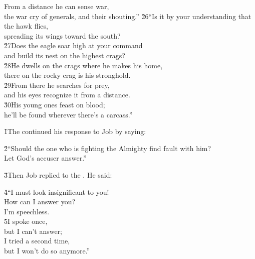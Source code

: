 \begin{poetry}
\poemll    From a distance he can sense war, \\
\poemlll       the war cry of generals, and their shouting.''
\poeml \v{26}``Is it by your understanding that the hawk flies, \\
\poemll    spreading its wings toward the south? \\
\poeml \v{27}Does the eagle soar high at your command \\
\poemll    and build its nest on the highest crags? \\
\poeml \v{28}He dwells on the crags where he makes his home, \\
\poemll    there on the rocky crag is his stronghold. \\
\poeml \v{29}From there he searches for prey, \\
\poemll    and his eyes recognize it from a distance. \\
\poeml \v{30}His young ones feast on blood; \\
\poemll    he'll be found wherever there's a carcass.''
\end{poetry}

\v{1}The  continued his response to Job by saying:

\begin{poetry}
\poeml \v{2}``Should the one who is fighting the Almighty find fault with him? \\
\poemll    Let God's accuser answer.''
\end{poetry}

\v{3}Then Job replied to the . He said:

\begin{poetry}
\poeml \v{4}``I must look insignificant to you! \\
\poemll    How can I answer you? \\
\poemlll       I'm speechless. \\
\poeml \v{5}I spoke once, \\
\poemll    but I can't answer; \\
\poeml I tried a second time, \\
\poemll    but I won't do so anymore.''
\end{poetry}

